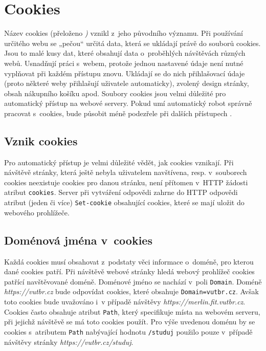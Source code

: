 \section{Cookies}
\label{sec:cookies}
Název cookies (přeloženo \textit{)} vznikl z~jeho původního významu. Při používání určitého webu se „pečou“ určitá data, která se ukládají právě do souborů cookies. Jsou to malé kusy dat, které obsahují data o~proběhlých návštěvách různých webů. Usnadňují práci s~webem, protože jednou nastavené údaje není nutné vyplňovat při každém přístupu znovu. Ukládají se do nich přihlašovací údaje (proto některé weby přihlašují uživatele automaticky), zvolený design stránky, obsah nákupního košíku apod.
Soubory cookies jsou velmi důležité pro automatický přístup na webové servery. Pokud umí automatický robot správně pracovat s~cookies, bude působit méně podezřele při dalších přístupech \cite{bib:developerMozilla}.

\subsection*{Vznik cookies}
Pro automatický přístup je velmi důležité vědět, jak cookies vznikají. Při návštěvě stránky, která ještě nebyla uživatelem navštívena, resp. v~souborech cookies neexistuje cookies pro danou stránku, není přítomen v~HTTP žádosti atribut \texttt{cookies}. Server při vytváření odpovědi zahrne do HTTP odpovědi atribut (jeden či více) \texttt{Set-cookie} obsahující cookies, které se mají uložit do webového prohlížeče.

\subsection*{Doménová jména v~cookies}
Každá cookies musí obsahovat z~podstaty věci informace o~doméně, pro kterou dané cookies patří. Při návštěvě webové stránky hledá webový prohlížeč cookies patřící navštěvované doméně. Doménové jméno se nachází v~poli \texttt{Domain}. Doméně \textit{https://vutbr.cz} bude odpovídat cookies, které obsahuje \texttt{Domain=vutbr.cz}. Avšak toto cookies bude uvažováno i~v případě návštěvy \textit{https://merlin.fit.vutbr.cz}. Cookies často obsahuje atribut \texttt{Path}, který specifikuje místa na webovém serveru, při jejichž návštěvě se má toto cookies použít. Pro výše uvedenou doménu by se cookies s~atributem \texttt{Path} nabývající hodnotu \texttt{/studuj} použilo pouze v~případě návštěvy stránky \textit{https://vutbr.cz/studuj}.

